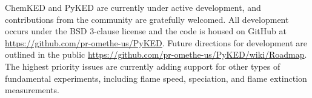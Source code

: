 \documentclass[12pt]{ussci}
\newcommand\ck{ChemKED}
\newcommand\pk{PyKED}
\begin{document}
\ck{} and \pk{} are currently under active development, and contributions from
the community are gratefully welcomed. All development occurs under the BSD
3-clause license and the code is housed on GitHub at
\url{https://github.com/pr-omethe-us/PyKED}. Future directions for development
are outlined in the public
\href{Roadmap}{https://github.com/pr-omethe-us/PyKED/wiki/Roadmap}. The highest
priority issues are currently adding support for other types of fundamental
experiments, including flame speed, speciation, and flame extinction
measurements.

\printbibliography
\end{document}
